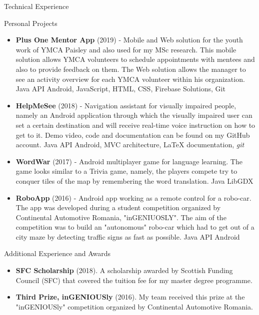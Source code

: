 \documentclass[]{mcdowellcv}
\begin{document}
	\begin{cvsection}{Technical Experience}
		\begin{cvsubsection}{Personal Projects}{}{}
			\begin{itemize}
				\item \textbf{Plus One Mentor App} (2019) - Mobile and Web solution for the youth work of YMCA Paisley and also used for my MSc research. This mobile solution allows YMCA volunteers to schedule appointments with mentees and also to provide feedback on them. The Web solution allows the manager to see an activity overview for each YMCA volunteer within his organization. Java API Android, JavaScript, HTML, CSS, Firebase Solutions, Git
				\item \textbf{HelpMeSee} (2018) - Navigation assistant for visually impaired people, namely an Android application through which the visually impaired user can set a certain destination and will receive real-time voice instruction on how to get to it. Demo video, code and documentation can be found on my GitHub account. Java API Android, MVC architecture, LaTeX documentation, \textit{git} 
				\item \textbf{WordWar} (2017) - Android multiplayer game for language learning. The game looks similar to a Trivia game, namely, the players compete try to conquer tiles of the map by remembering the word translation. Java LibGDX 
				\item \textbf{RoboApp} (2016) - Android app working as a remote control for a robo-car. The app was developed during a student competition organized by Continental Automotive Romania, "inGENIUOSLY". The aim of the competition was to build an "autonomous" robo-car which had to get out of a city maze by detecting traffic signs as fast as possible. Java API Android
			\end{itemize}
		\end{cvsubsection}
	\end{cvsection}
	
	\begin{cvsection}{Additional Experience and Awards}
		\begin{cvsubsection}{}{}{}	
			\begin{itemize}
				\item \textbf{SFC Scholarship} (2018). A scholarship awarded by Scottish Funding Council (SFC) that covered the tuition fee for my master degree programme.
				\item \textbf{Third Prize, inGENIOUSly} (2016). My team received this prize at the "inGENIOUSly" competition organized by Continental Automotive Romania. 
			\end{itemize}
		\end{cvsubsection}
	\end{cvsection}
\end{document}
